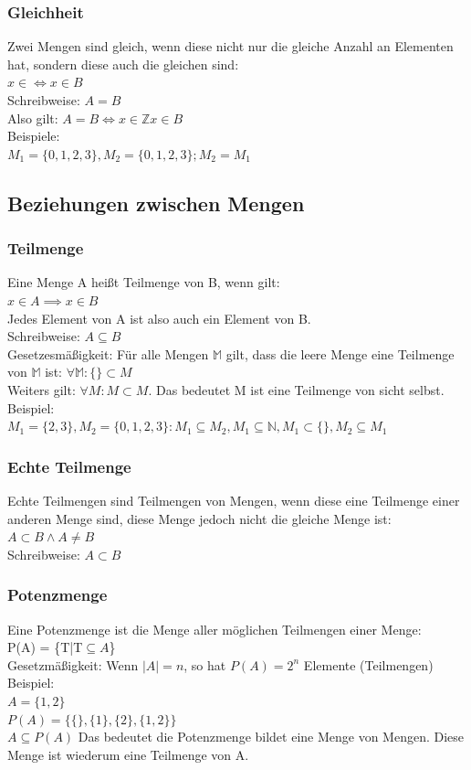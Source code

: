 \documentclass{article}
\newcommand{\N}{\mathbb{N}}
\newcommand{\Z}{\mathbb{Z}}
\newcommand{\M}{\mathbb{M}}
\begin{document}
	\subsubsection{Gleichheit}
	Zwei Mengen sind gleich, wenn diese nicht nur die gleiche Anzahl an Elementen hat, sondern diese auch die gleichen sind: \\
	$x\in \iff x \in B$ \\
	Schreibweise: $A = B$ \\
	Also gilt: $A = B \iff x \in \Z$\land $x \in B$\\
	Beispiele: \\
	$M_1 = \{0, 1, 2, 3\}, M_2 = \{0, 1, 2, 3\}; M_2 = M_1$
	\subsection{Beziehungen zwischen Mengen}
	\subsubsection{Teilmenge}
	Eine Menge A heißt Teilmenge von B, wenn gilt: \\
	$x\in A \implies x \in B$ \\
	Jedes Element von A ist also auch ein Element von B. \\
	Schreibweise: $A \subseteq B$\\
	Gesetzesmäßigkeit: Für alle Mengen $\M$ gilt, dass die leere Menge eine Teilmenge von $\M$ ist: $\forall \M:\{\}\subset M$ \\
	Weiters gilt: $\forall M:M\subset M$. Das bedeutet M ist eine Teilmenge von sicht selbst. \\
	Beispiel: \\
	$M_1 = \{2,3\}, M_2 = \{0, 1, 2, 3\}: M_1 \subseteq M_2, M_1 \subseteq \N, M_1 \subset \{\}, M_2 \subseteq M_1$
	\subsubsection{Echte Teilmenge}
	Echte Teilmengen sind Teilmengen von Mengen, wenn diese eine Teilmenge einer anderen Menge sind, diese Menge jedoch nicht die gleiche Menge ist: $A \subset B \land A \neq B$ \\
	Schreibweise: $A \subset B$
	\subsubsection{Potenzmenge}
	Eine Potenzmenge ist die Menge aller möglichen Teilmengen einer Menge: \\
	P(A) = \{T|T$\subseteq A$\} \\
	Gesetzmäßigkeit: Wenn $|A| = n$, so hat $P(A) = 2^n$ Elemente (Teilmengen) \\
	Beispiel: \\
	$A = \{1, 2\}$\\
	$P(A) = \{\{\}, \{1\}, \{2\}, \{1, 2\}\}$\\
	$A \subseteq P(A)$
	Das bedeutet die Potenzmenge bildet eine Menge von Mengen. Diese Menge ist wiederum eine Teilmenge von A.
\end{document}
